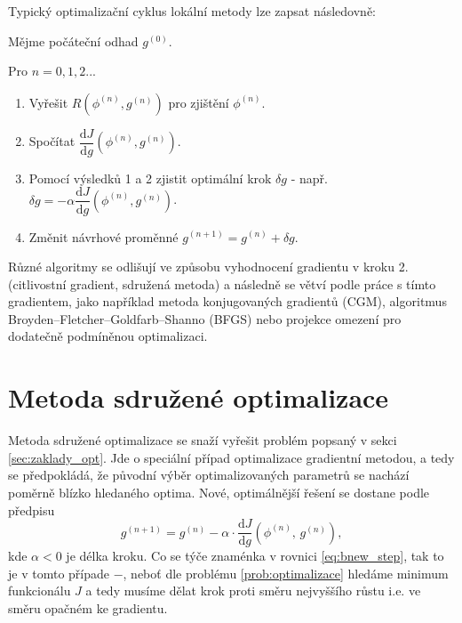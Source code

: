 Typický optimalizační cyklus lokální metody lze zapsat následovně:
\begin{addmargin}[3em]{2em}%
	\begin{description}
	\item 	Mějme počáteční odhad $ g^{(0)} $.
	\item 	Pro $ n=0,1,2... $
	 	\begin{enumerate}
			\item Vyřešit $ R(\phi^{(n)},g^{(n)}) $ pro zjištění $ \phi^{(n)} $.
			\item Spočítat $ \dfrac{\mathrm{d}J}{\mathrm{d}g}(\phi^{(n)},g^{(n)}) $.
			\item Pomocí výsledků 1 a 2 zjistit optimální krok $ \delta g $ - např. $ \delta g = -\alpha \dfrac{\mathrm{d}J}{\mathrm{d}g}(\phi^{(n)},g^{(n)}) $.
			\item Změnit návrhové proměnné $ g^{(n+1)} = g^{(n)} + \delta g $.
		\end{enumerate}
	\end{description}
\end{addmargin}
Různé algoritmy se odlišují ve způsobu vyhodnocení gradientu v kroku 2. (citlivostní gradient, sdružená metoda) a následně se větví podle práce s tímto gradientem, jako například metoda konjugovaných gradientů (CGM)\cite{hestenes1952methods}, algoritmus Broyden–Fletcher–Goldfarb–Shanno (BFGS)\cite{fletcher1987practical} nebo projekce omezení \cite{rosen1960gradient} pro dodatečně podmíněnou optimalizaci.  

\section{Metoda sdružené optimalizace}

Metoda sdružené optimalizace se snaží vyřešit problém popsaný v sekci \ref{sec:zaklady_opt}. 
Jde o speciální případ optimalizace gradientní metodou, a tedy se předpokládá, že původní výběr optimalizovaných parametrů se nachází poměrně blízko hledaného optima. Nové, optimálnější řešení se dostane podle předpisu
\begin{equation}\label{eq:bnew_step}
g^{(n+1)}=g^{(n)}-\alpha\cdot\dfrac{\mathrm{d}J}{\mathrm{d}g}(\phi^{(n)}, \, g^{(n)}),
\end{equation}
kde $ \alpha < 0 $ je délka kroku. 
Co se týče znaménka v rovnici \ref{eq:bnew_step}, tak to je v tomto případe $ - $, neboť dle problému \ref{prob:optimalizace} hledáme minimum funkcionálu $ J $ a tedy musíme dělat krok proti směru nejvyššího růstu i.e. ve směru opačném ke gradientu.

